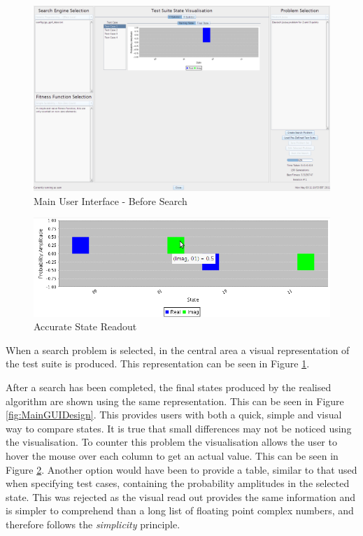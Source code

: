 \begin{figure}
 \includegraphics[width=\textwidth]{GUIDesignProgress.png}
\caption{Main User Interface - Before Search}
\label{fig:MainGUIDesignProg}
\end{figure}
\begin{figure}
 \includegraphics[width=\textwidth]{AccurateReadOutMouseOver.png}
\caption{Accurate State Readout}
\label{fig:AccStateReadOut}
\end{figure}
When a search problem is selected, in the central area a visual representation of the test suite is produced.
This representation can be seen in Figure \ref{fig:MainGUIDesignProg}.

After a search has been completed, the final states produced by the realised algorithm are shown using the same representation.
This can be seen in Figure \ref{fig:MainGUIDesign}.
This provides users with both a quick, simple and visual way to compare states.
It is true that small differences may not be noticed using the visualisation.
To counter this problem the visualisation allows the user to hover the mouse over each column to get an actual value.
This can be seen in Figure \ref{fig:AccStateReadOut}.
Another option would have been to provide a table, similar to that used when specifying test cases, containing the probability amplitudes in the selected state.
This was rejected as the visual read out provides the same information and is simpler to comprehend than a long list of floating point complex numbers, and therefore follows the \emph{simplicity} principle.

